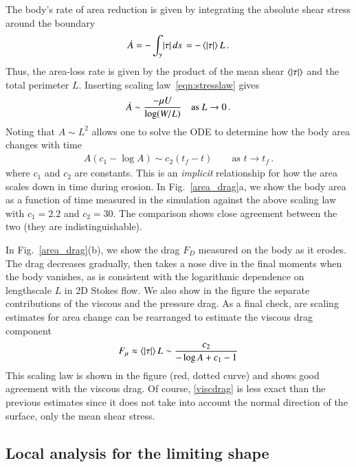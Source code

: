 \documentclass[preprint, 10pt]{elsarticle}
\begin{document}
The body's rate of area reduction is given by integrating the absolute shear stress around the boundary
\begin{align}
\dot{A} = - \int_{\gamma} \lvert \tau \rvert \, ds \,  = - \left< \lvert \tau \rvert \right> L \, .
\end{align}
Thus, the area-loss rate is given by the product of the mean shear
$\left< \lvert \tau \rvert \right>$ and the total perimeter $L$. Inserting scaling law~\eqref{eqn:stresslaw} gives
\begin{align}
\dot{A} \sim \frac{ - \mu U}{\log(W/L)} \quad \text{as } L \to 0 \, . 
\end{align}
Noting that $A \sim L^2$ allows one to solve the ODE to determine how the body area changes with time
\begin{align}
\label{area_predict}
A (c_1 - \log A) \sim c_2 (t_f - t) \qquad \text{as } t \to t_f \, .
\end{align}
where $c_1$ and $c_2$ are constants.
This is an {\em implicit} relationship for how the area scales down in time during erosion. In Fig.~\ref{area_drag}a, we show the body area as a function of time measured in the simulation against the above scaling law with $c_1 =2.2$ and $c_2 = 30$. The comparison shows close agreement between the two (they are indistinguishable).

In Fig.~\ref{area_drag}(b), we show the drag $F_D$ measured on the body as it erodes. The drag decreases gradually, then takes a nose dive in the final moments when the body vanishes, as is consistent with the logarithmic dependence on lengthscale $L$ in 2D Stokes flow. We also show in the figure the separate contributions of the viscous and the pressure drag. As a final check, are scaling estimates for area change can be rearranged to estimate the viscous drag component
\begin{align}
\label{viscdrag}
F_{\mu} \approx \left< \lvert \tau \rvert \right> L \sim \frac{c_2}{-\log A + c_1 -1}
\end{align}
This scaling law is shown in the figure (red, dotted curve) and shows good agreement with the viscous drag. Of course, \eqref{viscdrag} is less exact than the previous estimates since it does not take into account the normal direction of the surface, only the mean shear stress.

\subsection{Local analysis for the limiting shape}
\end{document}
